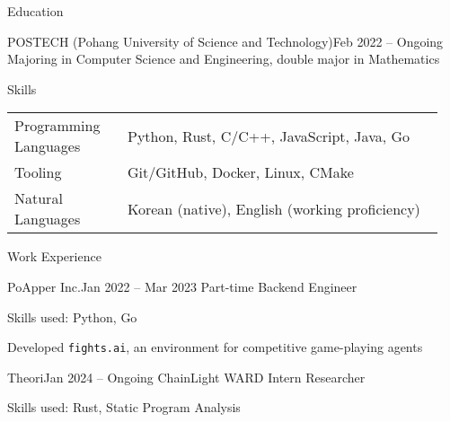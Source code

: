\documentclass{resume}
\begin{document}
\begin{res-section}{Education}
  \begin{res-subsection}{POSTECH (Pohang University of Science and Technology)}{Feb 2022 -- Ongoing}
    Majoring in Computer Science and Engineering, double major in Mathematics
  \end{res-subsection}
\end{res-section}

\begin{res-section}{Skills}
  \begin{tabular}{p{0.25\linewidth}p{0.7\linewidth}}
    Programming Languages
      & Python, Rust, C/C++, JavaScript, Java, Go \\
    Tooling
      & Git/GitHub, Docker, Linux, CMake \\
    Natural Languages
      & Korean (native), English (working proficiency)
  \end{tabular}
\end{res-section}

\begin{res-section}{Work Experience}
  \begin{res-subsection}{PoApper Inc.}{Jan 2022 -- Mar 2023}
    Part-time Backend Engineer

    \item Skills used: Python, Go

    \item Developed \texttt{fights.ai}, an environment for competitive game-playing agents
  \end{res-subsection}

  \begin{res-subsection}{Theori}{Jan 2024 -- Ongoing}
    ChainLight WARD Intern Researcher

    \item Skills used: Rust, Static Program Analysis
  \end{res-subsection}
\end{res-section}
\end{document}
